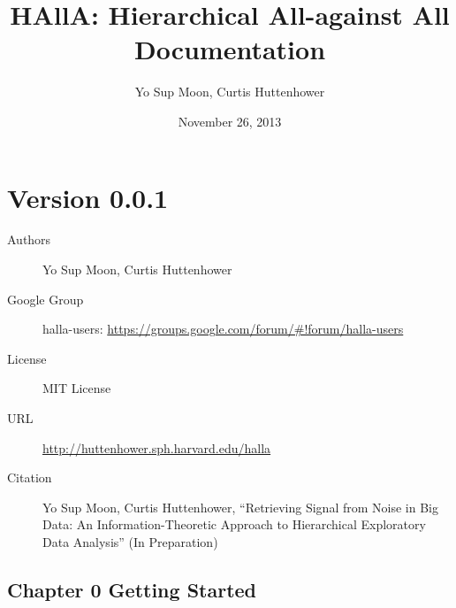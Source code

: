 \documentclass[letterpaper,10pt,english]{sphinxmanual}
\title{HAllA: Hierarchical All-against All Documentation}
\date{November 26, 2013}
\author{Yo Sup Moon, Curtis Huttenhower}
\begin{document}
\maketitle
\tableofcontents
{}\label{index::doc}



\chapter{Version 0.0.1}
\label{index:halla-hierarchical-all-against-all-association-testing}\label{index:version-0-0-1}\begin{description}
\item[{Authors}] \leavevmode
Yo Sup Moon, Curtis Huttenhower

\item[{Google Group}] \leavevmode
halla-users: \href{https://groups.google.com/forum/\#!forum/halla-users}{https://groups.google.com/forum/\#!forum/halla-users}

\item[{License}] \leavevmode
MIT License

\item[{URL}] \leavevmode
\href{http://huttenhower.sph.harvard.edu/halla}{http://huttenhower.sph.harvard.edu/halla}

\item[{Citation}] \leavevmode
Yo Sup Moon, Curtis Huttenhower, ``Retrieving Signal from Noise in Big Data: An Information-Theoretic Approach to Hierarchical Exploratory Data Analysis'' (In Preparation)

\end{description}


\section{Chapter 0 Getting Started}
\label{index:chapter-0-getting-started}
\end{document}
